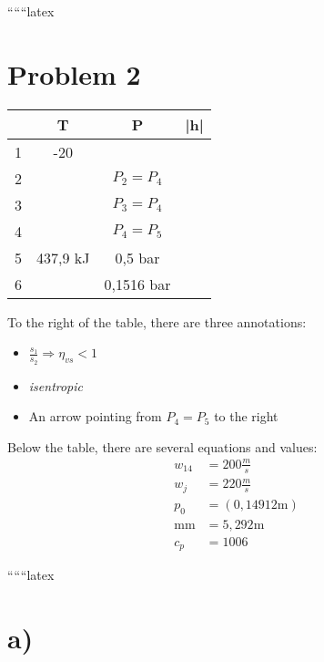 
``````latex


\section*{Problem 2}

\begin{tabular}{|c|c|c|c|}
\hline
 & T & P & |h| \\
\hline
1 & -20 & & \\
\hline
2 & & $P_2 = P_4$ & \\
\hline
3 & & $P_3 = P_4$ & \\
\hline
4 & & $P_4 = P_5$ & \\
\hline
5 & 437,9 kJ & 0,5 bar & \\
\hline
6 & & 0,1516 bar & \\
\hline
\end{tabular}

\bigskip

\noindent
To the right of the table, there are three annotations:
\begin{itemize}
    \item $ \frac{s_1}{s_2} \Rightarrow \eta_{vs} < 1 $
    \item \textit{isentropic}
    \item An arrow pointing from $P_4 = P_5$ to the right
\end{itemize}

\bigskip

\noindent
Below the table, there are several equations and values:
\begin{align*}
    w_{14} &= 200 \frac{m}{s} \\
    w_{j} &= 220 \frac{m}{s} \\
    p_0 &= (0,14912 \text{m}) \\
    \text{mm} &= 5,292 \text{m} \\
    c_p &= 1006
\end{align*}

``````latex


\section*{a)}

